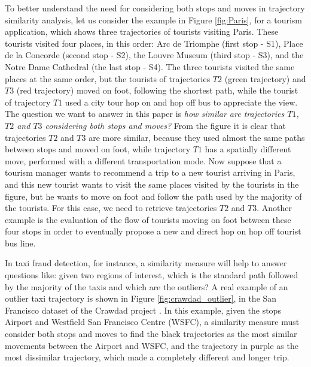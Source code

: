 {To better understand the need for considering both stops and moves in trajectory similarity analysis, let us consider the example in Figure \ref{fig:Paris}, for a tourism application, which shows three trajectories of tourists visiting Paris. These tourists visited four places, in this order:  Arc de Triomphe (first stop - S1), Place de la Concorde (second stop - S2), the Louvre Museum (third stop - S3), and the Notre Dame Cathedral (the last stop - S4). The three tourists visited the same places at the same order, but the tourists of trajectories $T2$ (green trajectory) and $T3$ (red trajectory) moved on foot, following the shortest path, while the tourist of trajectory $T1$ used a city tour hop on and hop off bus to appreciate the view. The question we want to answer in this paper is \emph{how similar are trajectories $T1$, $T2$ and $T3$ considering both stops and moves?} From the figure it is clear that trajectories $T2$ and $T3$ are more similar, because they used almost the same paths between stops and moved on foot, while trajectory $T1$ has a spatially different move, performed with a different transportation mode. Now suppose that a tourism manager wants to recommend a trip to a new tourist arriving in Paris, and this new tourist wants to visit the same places visited by the tourists in the figure, but he wants to move on foot and follow the path used by the majority of the tourists.
For this case, we need to retrieve trajectories $T2$ and $T3$. 
Another example is the evaluation of the flow of tourists moving on foot between these four stops in order to eventually propose a new and direct hop on hop off tourist bus line.}

{In taxi fraud detection, for instance, a similarity measure will help to answer questions like: given two regions of interest, which is the standard path followed by the majority of the taxis and which are the outliers?
A real example of an outlier taxi trajectory is shown in Figure {\ref{fig:crawdad_outlier}}, in the San Francisco dataset of the Crawdad project} \cite{epfl-mobility-20090224}. {In this example, given the stops Airport and  Westfield San Francisco Centre (WSFC), a similarity measure must consider both stops and moves to find the black trajectories as the most similar movements between the Airport and WSFC, and the trajectory in purple as the most dissimilar trajectory, which made a completely different and longer trip.}
 
